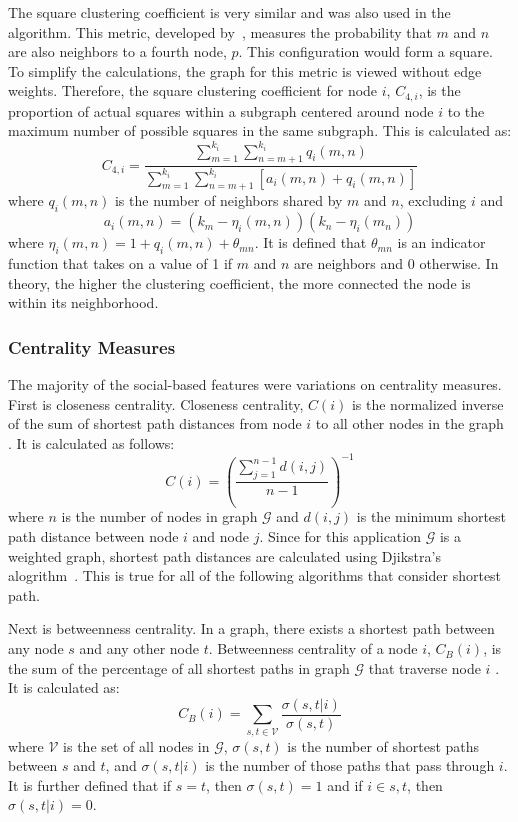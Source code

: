 \documentclass[12pt]{report}
\begin{document}
The square clustering coefficient is very similar and was also used in the algorithm.
This metric, developed by~\cite{lind_cycles_2005}, measures the probability that $m$ and $n$ are also neighbors to a fourth node, $p$.
This configuration would form a square.
To simplify the calculations, the graph for this metric is viewed without edge weights.
Therefore, the square clustering coefficient for node $i$, $C_{4,i}$, is the proportion of actual squares within a subgraph centered around node $i$ to the maximum number of possible squares in the same subgraph.
This is calculated as:
\begin{equation}
C_{4,i} = \frac{\sum_{m=1}^{k_i}\sum_{n=m+1}^{k_i}q_i(m,n)}{\sum_{m=1}^{k_i} \sum_{n=m+1}^{k_i}\left[a_i(m,n)+q_i(m,n) \right]}
\end{equation}
where $q_i(m,n)$ is the number of neighbors shared by $m$ and $n$, excluding $i$ and 
\begin{equation}
a_i(m,n) = (k_m-\eta_i(m,n))(k_n-\eta_i(m_n)) 
\end{equation}
where $\eta_i(m,n) = 1+q_i(m,n)+\theta_{mn}$.  
It is defined that $\theta_{mn}$ is an indicator function that takes on a value of 1 if $m$ and $n$ are neighbors and 0 otherwise.
In theory, the higher the clustering coefficient, the more connected the node is within its neighborhood.

\subsubsection{Centrality Measures}
The majority of the social-based features were variations on centrality measures.
First is closeness centrality.
Closeness centrality, $C(i)$ is the normalized inverse of the sum of shortest path distances from node $i$ to all other nodes in the graph \cite{freeman_centrality_1978}.  It is calculated as follows:
\begin{equation}
C(i) = \left(\frac{\sum_{j=1}^{n-1}d(i,j)}{n-1}\right)^{-1}
\end{equation}
where $n$ is the number of nodes in graph $\mathcal{G}$ and $d(i,j)$ is the minimum shortest path distance between node $i$ and node $j$.
Since for this application $\mathcal{G}$ is a weighted graph, shortest path distances are calculated using Djikstra's alogrithm~\cite{dijkstra1959note}.
This is true for all of the following algorithms that consider shortest path.

Next is betweenness centrality.
In a graph, there exists a shortest path between any node $s$ and any other node $t$.  Betweenness centrality of a node $i$, $C_B(i)$, is the sum of the percentage of all shortest paths in graph $\mathcal{G}$ that traverse node $i$ \cite{freeman_set_1977}.
It is calculated as:
\begin{equation}
C_B(i) = \sum_{s,t\in \mathcal{V}}\frac{\sigma(s,t|i)}{\sigma(s,t)}
\end{equation}
where $\mathcal{V}$ is the set of all nodes in $\mathcal{G}$, $\sigma(s,t)$ is the number of shortest paths between $s$ and $t$, and $\sigma(s,t|i)$ is the number of those paths that pass through $i$.
It is further defined that if $s=t$, then $\sigma(s,t)=1$ and if $i\in s,t$, then $\sigma(s,t|i) = 0$.
\end{document}
